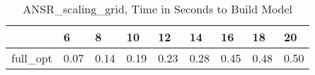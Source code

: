 \begin{table}
\caption{ANSR\_scaling\_grid, Time in Seconds to Build Model}
\label{ANSR_scaling_grid_model_time}
\begin{tabular}{lllllllll}
\toprule
 & 6 & 8 & 10 & 12 & 14 & 16 & 18 & 20 \\
\midrule
full\_opt & 0.07 & 0.14 & 0.19 & 0.23 & 0.28 & 0.45 & 0.48 & 0.50 \\
\bottomrule
\end{tabular}
\end{table}
